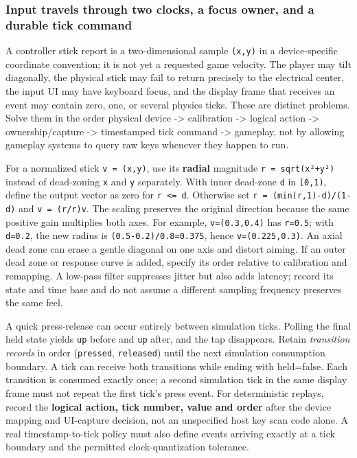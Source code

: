 \subsubsection{Input travels through two clocks, a focus owner, and a durable tick command}\label{05-engine-i-ch014-input-travels-through-two-clocks-a-focus-owner-and-a-durable-tick-command}

A controller stick report is a two-dimensional sample \texttt{(x,y)} in a device-specific coordinate convention; it is not yet a requested game velocity. The player may tilt diagonally, the physical stick may fail to return precisely to the electrical center, the input UI may have keyboard focus, and the display frame that receives an event may contain zero, one, or several physics ticks. These are distinct problems. Solve them in the order physical device -\textgreater{} calibration -\textgreater{} logical action -\textgreater{} ownership/capture -\textgreater{} timestamped tick command -\textgreater{} gameplay, not by allowing gameplay systems to query raw keys whenever they happen to run.

For a normalized stick \texttt{v\ =\ (x,y)}, use its \textbf{radial} magnitude \texttt{r\ =\ sqrt(x²+y²)} instead of dead-zoning \texttt{x} and \texttt{y} separately. With inner dead-zone \texttt{d} in \texttt{{[}0,1)}, define the output vector as zero for \texttt{r\ \textless{}=\ d}. Otherwise set \texttt{r\textquotesingle{}\ =\ (min(r,1)-d)/(1-d)} and \texttt{v\textquotesingle{}\ =\ (r\textquotesingle{}/r)v}. The scaling preserves the original direction because the same positive gain multiplies both axes. For example, \texttt{v=(0.3,0.4)} has \texttt{r=0.5}; with \texttt{d=0.2}, the new radius is \texttt{(0.5-0.2)/0.8=0.375}, hence \texttt{v\textquotesingle{}=(0.225,0.3)}. An axial dead zone can erase a gentle diagonal on one axis and distort aiming. If an outer dead zone or response curve is added, specify its order relative to calibration and remapping. A low-pass filter suppresses jitter but also adds latency; record its state and time base and do not assume a different sampling frequency preserves the same feel.

A quick press-release can occur entirely between simulation ticks. Polling the final held state yields \texttt{up} before and \texttt{up} after, and the tap disappears. Retain \emph{transition records} in order (\texttt{pressed}, \texttt{released}) until the next simulation consumption boundary. A tick can receive both transitions while ending with held=false. Each transition is consumed exactly once; a second simulation tick in the same display frame must not repeat the first tick's press event. For deterministic replays, record the \textbf{logical action, tick number, value and order} after the device mapping and UI-capture decision, not an unspecified host key scan code alone. A real timestamp-to-tick policy must also define events arriving exactly at a tick boundary and the permitted clock-quantization tolerance.

